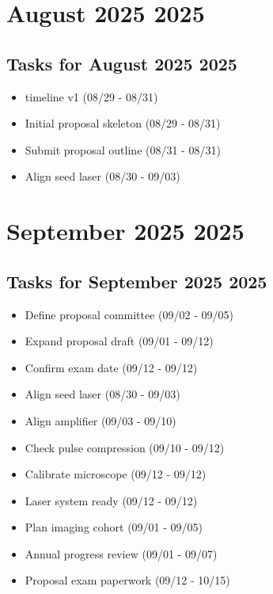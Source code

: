 \documentclass[landscape,a4paper]{article}
\begin{document}
\section*{August 2025 2025}

\begin{center}
\begin{tikzpicture}[scale=0.9]
\end{tikzpicture}
\end{center}

\vspace{1cm}

\subsection*{Tasks for August 2025 2025}
\begin{itemize}
\item timeline v1 (08/29 - 08/31)
\item Initial proposal skeleton (08/29 - 08/31)
\item Submit proposal outline (08/31 - 08/31)
\item Align seed laser (08/30 - 09/03)
\end{itemize}
\newpage

\section*{September 2025 2025}

\begin{center}
\begin{tikzpicture}[scale=0.9]
\end{tikzpicture}
\end{center}

\vspace{1cm}

\subsection*{Tasks for September 2025 2025}
\begin{itemize}
\item Define proposal committee (09/02 - 09/05)
\item Expand proposal draft (09/01 - 09/12)
\item Confirm exam date (09/12 - 09/12)
\item Align seed laser (08/30 - 09/03)
\item Align amplifier (09/03 - 09/10)
\item Check pulse compression (09/10 - 09/12)
\item Calibrate microscope (09/12 - 09/12)
\item Laser system ready (09/12 - 09/12)
\item Plan imaging cohort (09/01 - 09/05)
\item Annual progress review (09/01 - 09/07)
\item Proposal exam paperwork (09/12 - 10/15)
\end{itemize}
\newpage
\end{document}

